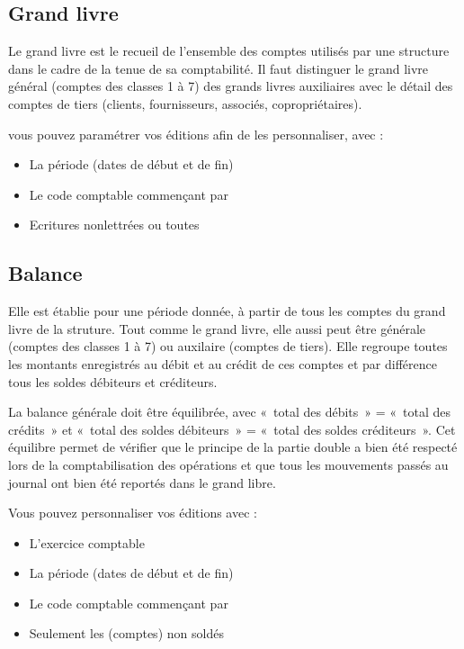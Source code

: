 \documentclass[a4paper,10pt,oneside,french]{sphinxmanual}
\begin{document}
\subsection{Grand livre}
\label{\detokenize{accounting/reporting:grand-livre}}
Le grand livre est le recueil de l’ensemble des comptes utilisés par une structure dans le cadre de la tenue de sa comptabilité.
Il faut distinguer le grand livre général (comptes des classes 1 à 7) des grands livres auxiliaires avec le détail des comptes de tiers (clients, fournisseurs, associés, copropriétaires).

vous pouvez paramétrer vos éditions afin de les personnaliser, avec :
\begin{itemize}
\item {} 
La période (dates de début et de fin)

\item {} 
Le code comptable commençant par

\item {} 
Ecritures non\sphinxhyphen{}lettrées ou toutes

\end{itemize}


\subsection{Balance}
\label{\detokenize{accounting/reporting:balance}}
Elle est établie pour une période donnée, à partir de tous les comptes du grand livre de la struture. Tout comme le grand livre, elle aussi peut être générale (comptes des classes 1 à 7) ou auxilaire (comptes de tiers). Elle regroupe toutes les montants enregistrés au débit et au crédit de ces comptes et par différence tous les soldes débiteurs et créditeurs.

La balance générale doit être équilibrée, avec « total des débits » = « total des crédits » et « total des soldes débiteurs » = « total des soldes créditeurs ». Cet équilibre permet de vérifier que le principe de la partie double a bien été respecté lors de la comptabilisation des opérations et que tous les mouvements passés au journal ont bien été reportés dans le grand libre.

Vous pouvez personnaliser vos éditions avec :
\begin{itemize}
\item {} 
L’exercice comptable

\item {} 
La période (dates de début et de fin)

\item {} 
Le code comptable commençant par

\item {} 
Seulement les (comptes) non soldés

\end{itemize}
\end{document}
